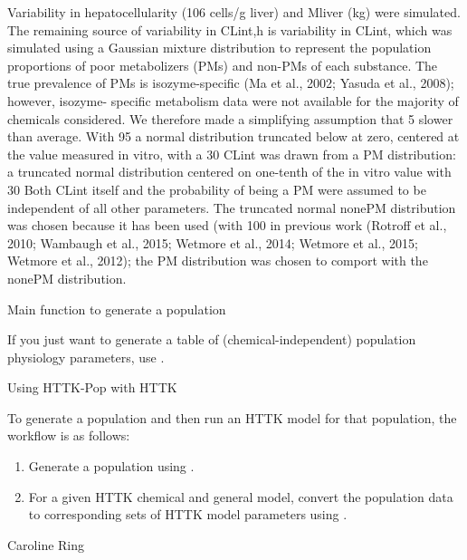 \documentclass[a4paper]{book}
\begin{document}
\begin{Details}
Variability in hepatocellularity (106 cells/g liver) and Mliver (kg)
were simulated. The remaining source of variability in CLint,h is variability
in CLint, which was simulated using a Gaussian mixture distribution
to represent the population proportions of poor metabolizers
(PMs) and non-PMs of each substance. The true prevalence of PMs is
isozyme-specific (Ma et al., 2002; Yasuda et al., 2008); however, isozyme-
specific metabolism data were not available for the majority of
chemicals considered. We therefore made a simplifying assumption that
5
slower than average.
With 95
a normal distribution truncated below at zero, centered at the value
measured in vitro, with a 30
CLint was drawn from a PM distribution: a truncated normal
distribution centered on one-tenth of the in vitro value with 30
Both CLint itself and the probability of being a PM were assumed to be
independent of all other parameters. The truncated normal nonePM
distribution was chosen because it has been used (with 100
in previous work (Rotroff et al., 2010; Wambaugh et al., 2015;
Wetmore et al., 2014; Wetmore et al., 2015; Wetmore et al., 2012); the
PM distribution was chosen to comport with the nonePM distribution.
\end{Details}
%
\begin{Section}{Main function to generate a population}

If you just want to generate
a table of (chemical-independent) population physiology parameters, use 
.
\end{Section}
%
\begin{Section}{Using HTTK-Pop with HTTK}

To generate a population and then run an 
HTTK model for that population, the workflow is as follows: \begin{enumerate}
 
\item{} Generate a population using . \item{} For
a given HTTK chemical and general model, convert the population data to 
corresponding sets of HTTK model parameters using 
.
\end{enumerate}

\end{Section}
%
\begin{Author}\relax
Caroline Ring
\end{Author}
%
\end{document}
